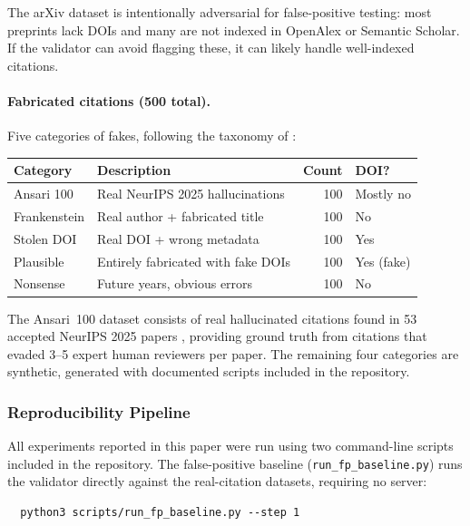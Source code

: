 The arXiv dataset is intentionally adversarial for false-positive testing: most preprints lack DOIs and many are not indexed in OpenAlex or Semantic Scholar. If the validator can avoid flagging these, it can likely handle well-indexed citations.

\paragraph{Fabricated citations (500 total).} Five categories of fakes, following the taxonomy of \citet{ansari2025}:

\begin{center}
\begin{tabular}{@{}llrl@{}}
\toprule
\textbf{Category} & \textbf{Description} & \textbf{Count} & \textbf{DOI?} \\
\midrule
Ansari 100    & Real NeurIPS 2025 hallucinations       & 100 & Mostly no \\
Frankenstein  & Real author + fabricated title          & 100 & No \\
Stolen DOI    & Real DOI + wrong metadata               & 100 & Yes \\
Plausible     & Entirely fabricated with fake DOIs       & 100 & Yes (fake) \\
Nonsense      & Future years, obvious errors             & 100 & No \\
\bottomrule
\end{tabular}
\end{center}

The Ansari~100 dataset consists of real hallucinated citations found in 53 accepted NeurIPS 2025 papers \citep{ansari2025}, providing ground truth from citations that evaded 3--5 expert human reviewers per paper. The remaining four categories are synthetic, generated with documented scripts included in the repository.

\subsubsection{Reproducibility Pipeline}

All experiments reported in this paper were run using two command-line scripts included in the repository. The false-positive baseline (\texttt{run\_fp\_baseline.py}) runs the validator directly against the real-citation datasets, requiring no server:

\begin{verbatim}
  python3 scripts/run_fp_baseline.py --step 1
\end{verbatim}

